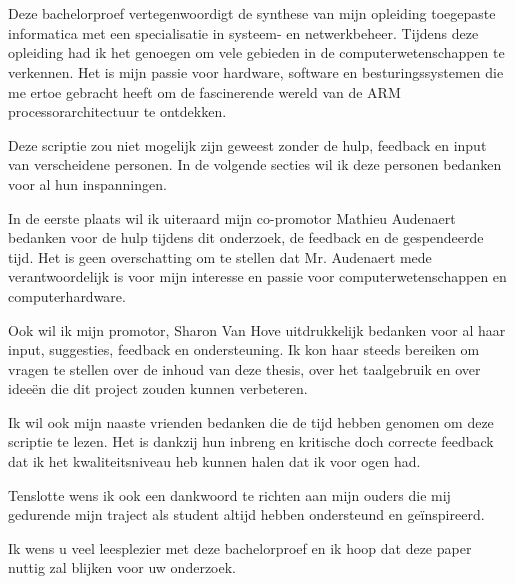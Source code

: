 
\chapter*{}
\label{ch:voorwoord}


Deze bachelorproef vertegenwoordigt de synthese van mijn opleiding toegepaste informatica met een specialisatie in systeem- en netwerkbeheer. Tijdens deze opleiding had ik het genoegen om vele gebieden in de computerwetenschappen te verkennen. Het is mijn passie voor hardware, software en besturingssystemen die me ertoe gebracht heeft om de fascinerende wereld van de ARM processorarchitectuur te ontdekken.

Deze scriptie zou niet mogelijk zijn geweest zonder de hulp, feedback en input van verscheidene personen. In de volgende secties wil ik deze personen bedanken voor al hun inspanningen. 

In de eerste plaats wil ik uiteraard mijn co-promotor Mathieu Audenaert bedanken voor de hulp tijdens dit onderzoek, de feedback en de gespendeerde tijd. Het is geen overschatting om te stellen dat Mr. Audenaert mede verantwoordelijk is voor mijn interesse en passie voor computerwetenschappen en computerhardware.

Ook wil ik mijn promotor, Sharon Van Hove uitdrukkelijk bedanken voor al haar input, suggesties, feedback en ondersteuning. Ik kon haar steeds bereiken om vragen te stellen over de inhoud van deze thesis, over het taalgebruik en over ideeën die dit project zouden kunnen verbeteren.

Ik wil ook mijn naaste vrienden bedanken die de tijd hebben genomen om deze scriptie te lezen. Het is dankzij hun inbreng en kritische doch correcte feedback dat ik het kwaliteitsniveau heb kunnen halen dat ik voor ogen had.

Tenslotte wens ik ook een dankwoord te richten aan mijn ouders die mij gedurende mijn traject als student altijd hebben ondersteund en geïnspireerd. 

Ik wens u veel leesplezier met deze bachelorproef en ik hoop dat deze paper nuttig zal blijken voor uw onderzoek.
